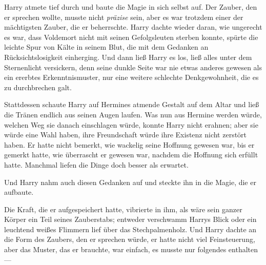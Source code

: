 Harry atmete tief durch und baute die Magie in sich selbst auf. Der Zauber, den er sprechen wollte, musste nicht \emph{präzise} sein, aber es war trotzdem einer der mächtigsten Zauber, die er beherrschte.
Harry dachte wieder daran, wie ungerecht es war, dass Voldemort nicht mit seinen Gefolgsleuten sterben konnte, spürte die leichte Spur von Kälte in seinem Blut, die mit dem Gedanken an Rücksichtslosigkeit einherging. Und dann ließ Harry es los, ließ alles unter dem Sternenlicht versickern, denn seine dunkle Seite war nie etwas anderes gewesen als ein ererbtes Erkenntnismuster, nur eine weitere schlechte Denkgewohnheit, die es zu durchbrechen galt.

Stattdessen schaute Harry auf Hermines atmende Gestalt auf dem Altar und ließ die Tränen endlich aus seinen Augen laufen. Was nun aus Hermine werden würde, welchen Weg sie danach einschlagen würde, konnte Harry nicht erahnen; aber sie würde eine Wahl haben, ihre Freundschaft würde ihre Existenz nicht zerstört haben. Er hatte nicht bemerkt, wie wackelig seine Hoffnung gewesen war, bis er gemerkt hatte, wie überrascht er gewesen war, nachdem die Hoffnung sich erfüllt hatte. Manchmal liefen die Dinge doch besser als erwartet.

Und Harry nahm auch diesen Gedanken auf und steckte ihn in die Magie, die er aufbaute.

Die Kraft, die er aufgespeichert hatte, vibrierte in ihm, als wäre sein ganzer Körper ein Teil seines Zauberstabs; entweder verschwamm Harrys Blick oder ein leuchtend weißes Flimmern lief über das Stechpalmenholz. Und Harry dachte an die Form des Zaubers, den er sprechen würde, er hatte nicht viel Feinsteuerung, aber das Muster, das er brauchte, war einfach, es musste nur folgendes enthalten —


